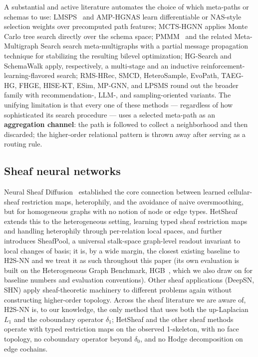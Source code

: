 \documentclass{article}
\begin{document}
A substantial and active literature automates the choice of which meta-paths or schemas to use:
LMSPS~\citep{yan2024lmsps} and AMP-HGNAS learn differentiable or NAS-style selection weights over
precomputed path features; MCTS-HGNN applies Monte Carlo tree search directly over the schema
space; PMMM~\citep{jiang2022pmmm} and the related Meta-Multigraph Search search meta-multigraphs
with a partial message propagation technique for stabilizing the resulting bilevel optimization;
HG-Search and SchemaWalk apply, respectively, a multi-stage and an inductive
reinforcement-learning-flavored search; RMS-HRec, SMCD, HeteroSample, EvoPath, TAEG-HG, FHGE,
HISE-KT, ESim, MP-GNN, and LPSMS round out the broader family with recommendation-, LLM-, and
sampling-oriented variants. The unifying limitation is that every one of these methods ---
regardless of how sophisticated its search procedure --- uses a selected meta-path as an
\textbf{aggregation channel}: the path is followed to collect a neighborhood and then discarded; the
higher-order relational pattern is thrown away after serving as a routing rule.

\subsection{Sheaf neural networks}

Neural Sheaf Diffusion~\citep{bodnar2022neural} established the core connection between learned
cellular-sheaf restriction maps, heterophily, and the avoidance of naive oversmoothing, but for
homogeneous graphs with no notion of node or edge types. HetSheaf~\citep{braithwaite2024hetsheaf}
extends this to the heterogeneous setting, learning typed sheaf restriction maps and handling
heterophily through per-relation local spaces, and further introduces SheafPool, a universal
stalk-space graph-level readout invariant to local changes of basis; it is, by a wide margin, the
closest existing baseline to H2S-NN and we treat it as such throughout this paper (its own
evaluation is built on the Heterogeneous Graph Benchmark, HGB~\citep{lv2021hgb}, which we also
draw on for baseline numbers and evaluation conventions). Other sheaf applications (DeepSN, SHN)
apply sheaf-theoretic machinery to different problems again without constructing higher-order
topology. Across the sheaf literature we are aware of, H2S-NN is, to our knowledge, the only method
that uses both the up-Laplacian $L_1$ and the coboundary operator $\delta_1$; HetSheaf and the
other sheaf methods operate with typed restriction maps on the observed 1-skeleton, with no face
topology, no coboundary operator beyond $\delta_0$, and no Hodge decomposition on edge cochains.
\end{document}
